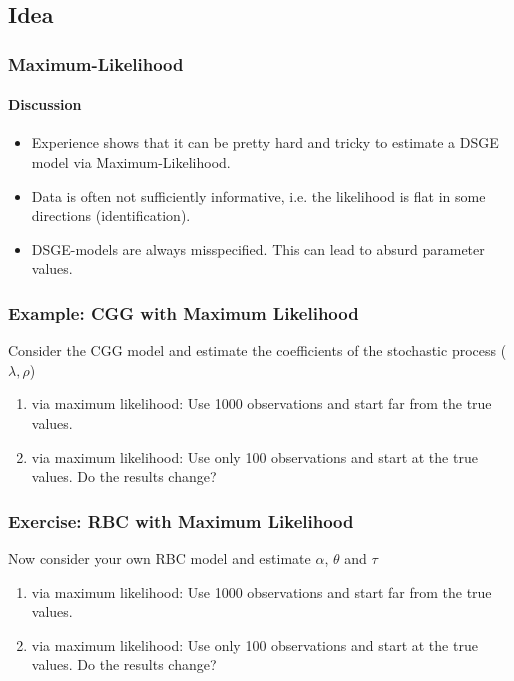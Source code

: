 \documentclass[handout]{beamer}  %
\begin{document}
\subsection{Idea}
\begin{frame}\frametitle{Maximum-Likelihood}\framesubtitle{Discussion}
	\begin{itemize}
		\item Experience shows that it can be pretty hard and tricky to estimate a DSGE model via Maximum-Likelihood.
		\item Data is often not sufficiently informative, i.e. the likelihood is flat in some directions (identification).
		\item DSGE-models are always misspecified. This can lead to absurd parameter values.
	\end{itemize}
\end{frame}


\begin{frame}\frametitle{Example: CGG with Maximum Likelihood}
	Consider the CGG model and estimate the coefficients of the stochastic process ($\lambda,\rho$)
	\begin{enumerate}
		\item via maximum likelihood: Use 1000 observations and start far from the true values.
		\item via maximum likelihood: Use only 100 observations and start at the true values. Do the results change?
	\end{enumerate}
\end{frame}

\begin{frame}\frametitle{Exercise: RBC with Maximum Likelihood}
	Now consider your own RBC model and estimate $\alpha$, $\theta$ and $\tau$
	\begin{enumerate}
		\item via maximum likelihood: Use 1000 observations and start far from the true values.
		\item via maximum likelihood: Use only 100 observations and start at the true values. Do the results change?
	\end{enumerate}
\end{frame}
\end{document}
